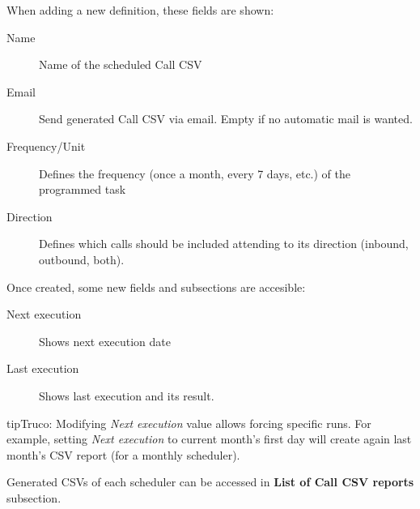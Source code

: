 \documentclass[letterpaper,10pt,spanish]{sphinxmanual}
\begin{document}
When adding a new definition, these fields are shown:
\begin{description}
\item[{Name}] \leavevmode{}\label{administration_portal/client/wholesale/calls/call_csv_schedulers:term-name}
Name of the scheduled Call CSV

\item[{Email}] \leavevmode{}\label{administration_portal/client/wholesale/calls/call_csv_schedulers:term-email}
Send generated Call CSV via email. Empty if no automatic mail is wanted.

\item[{Frequency/Unit}] \leavevmode{}\label{administration_portal/client/wholesale/calls/call_csv_schedulers:term-frequency-unit}
Defines the frequency (once a month, every 7 days, etc.) of the programmed task

\item[{Direction}] \leavevmode{}\label{administration_portal/client/wholesale/calls/call_csv_schedulers:term-direction}
Defines which calls should be included attending to its direction (inbound, outbound, both).

\end{description}

Once created, some new fields and subsections are accesible:
\begin{description}
\item[{Next execution}] \leavevmode{}\label{administration_portal/client/wholesale/calls/call_csv_schedulers:term-next-execution}
Shows next execution date

\item[{Last execution}] \leavevmode{}\label{administration_portal/client/wholesale/calls/call_csv_schedulers:term-last-execution}
Shows last execution and its result.

\end{description}

\begin{notice}{tip}{Truco:}
Modifying \emph{Next execution} value allows forcing specific runs. For example, setting \emph{Next execution} to
current month's first day will create again last month's CSV report (for a monthly scheduler).
\end{notice}

Generated CSVs of each scheduler can be accessed in \textbf{List of Call CSV reports} subsection.
\end{document}
